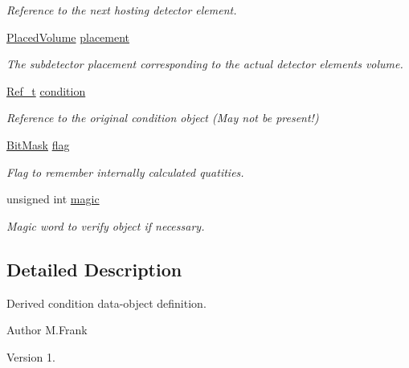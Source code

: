 \begin{DoxyCompactItemize}
\begin{DoxyCompactList}\small\item\em Reference to the next hosting detector element. \end{DoxyCompactList}\item 
\hyperlink{class_d_d4hep_1_1_alignments_1_1_alignment_data_aab2d43f5a4a4c2163e0a04905306525a}{Placed\+Volume} \hyperlink{class_d_d4hep_1_1_alignments_1_1_alignment_data_a0da8f92652a64d0ca69a1c884bd5b034}{placement}
\begin{DoxyCompactList}\small\item\em The subdetector placement corresponding to the actual detector element\textquotesingle{}s volume. \end{DoxyCompactList}\item 
\hyperlink{group___d_d4_h_e_p___g_e_o_m_e_t_r_y_ga40af83be6718bb8828a3d83dc7f8c930}{Ref\+\_\+t} \hyperlink{class_d_d4hep_1_1_alignments_1_1_alignment_data_aab00f6e7c9ac1f261f68440ade585cbb}{condition}
\begin{DoxyCompactList}\small\item\em Reference to the original condition object (May not be present!) \end{DoxyCompactList}\item 
\hyperlink{class_d_d4hep_1_1_alignments_1_1_alignment_data_ab5c31f7e5512ca675be8323bc723b123}{Bit\+Mask} \hyperlink{class_d_d4hep_1_1_alignments_1_1_alignment_data_a49383dd1e10e850bfeb455440439dec2}{flag}
\begin{DoxyCompactList}\small\item\em Flag to remember internally calculated quatities. \end{DoxyCompactList}\item 
unsigned int \hyperlink{class_d_d4hep_1_1_alignments_1_1_alignment_data_a52652c8211546dca391a248a6f4c422a}{magic}
\begin{DoxyCompactList}\small\item\em Magic word to verify object if necessary. \end{DoxyCompactList}\end{DoxyCompactItemize}


\subsection{Detailed Description}
Derived condition data-\/object definition. 

\begin{DoxyAuthor}{Author}
M.\+Frank 
\end{DoxyAuthor}
\begin{DoxyVersion}{Version}
1. 
\end{DoxyVersion}


